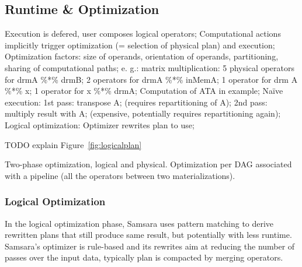 \documentclass{article}
\begin{document}
\subsection{Runtime \& Optimization}

Execution is defered, user composes logical operators; Computational actions implicitly trigger optimization (= selection of physical plan) and execution; Optimization factors:  size of operands, orientation of operands, partitioning, sharing of computational paths; e. g.: matrix multiplication: 5 physical operators for drmA \%*\% drmB; 2 operators for drmA \%*\% inMemA; 1 operator for drm A \%*\% x; 1 operator for x \%*\% drmA; Computation of ATA in example; Naïve execution: 1st  pass: transpose A; (requires repartitioning of A); 2nd pass: multiply result with A; (expensive, potentially requires repartitioning again); Logical optimization: Optimizer rewrites plan to use; 

TODO explain Figure~\ref{fig:logicalplan}

Two-phase optimization, logical and physical. Optimization per DAG associated with a pipeline (all the operators between two materializations).

\subsubsection{Logical Optimization}

In the logical optimization phase, Samsara uses pattern matching to derive rewritten plans that still produce same result, but potentially with less runtime. Samsara's optimizer is rule-based and its rewrites aim at reducing the number of passes over the input data, typically plan is compacted by merging operators. 
\end{document}
